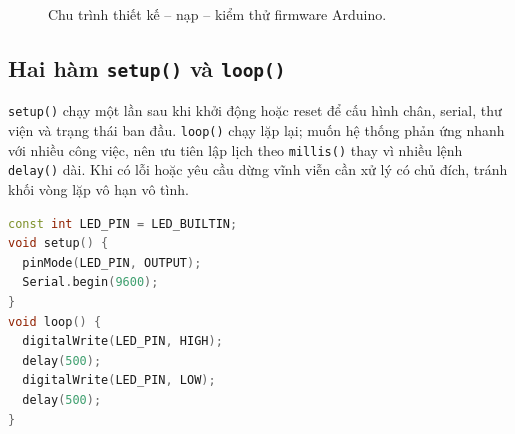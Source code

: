 \begin{figure}[htbp]\centering
{}
\caption{Chu trình thiết kế -- nạp -- kiểm thử firmware Arduino.}
\end{figure}

\subsection{Hai hàm \texttt{setup()} và \texttt{loop()}}
\texttt{setup()} chạy một lần sau khi khởi động hoặc reset để cấu hình chân, serial, thư viện và trạng thái ban đầu. \texttt{loop()} chạy lặp lại; muốn hệ thống phản ứng nhanh với nhiều công việc, nên ưu tiên lập lịch theo \texttt{millis()} thay vì nhiều lệnh \texttt{delay()} dài. Khi có lỗi hoặc yêu cầu dừng vĩnh viễn cần xử lý có chủ đích, tránh khối vòng lặp vô hạn vô tình.

\begin{lstlisting}[language=C++,caption={Cấu trúc sketch tối thiểu}]
const int LED_PIN = LED_BUILTIN;
void setup() {
  pinMode(LED_PIN, OUTPUT);
  Serial.begin(9600);
}
void loop() {
  digitalWrite(LED_PIN, HIGH);
  delay(500);
  digitalWrite(LED_PIN, LOW);
  delay(500);
}
\end{lstlisting}

